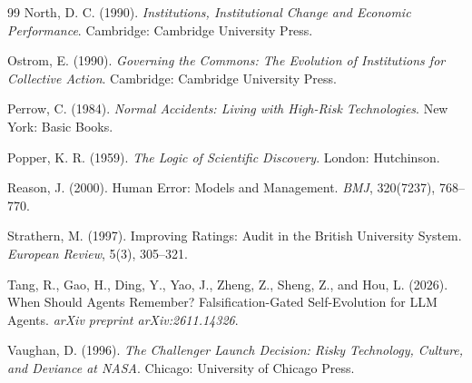 \documentclass[11pt]{article}
\theoremstyle{definition}
\begin{document}
\begin{thebibliography}{99}
North, D. C. (1990). \emph{Institutions, Institutional Change and Economic Performance}. Cambridge: Cambridge University Press.

Ostrom, E. (1990). \emph{Governing the Commons: The Evolution of Institutions for Collective Action}. Cambridge: Cambridge University Press.

Perrow, C. (1984). \emph{Normal Accidents: Living with High-Risk Technologies}. New York: Basic Books.

Popper, K. R. (1959). \emph{The Logic of Scientific Discovery}. London: Hutchinson.

Reason, J. (2000). Human Error: Models and Management. \emph{BMJ}, 320(7237), 768--770.

Strathern, M. (1997). Improving Ratings: Audit in the British University System. \emph{European Review}, 5(3), 305--321.

Tang, R., Gao, H., Ding, Y., Yao, J., Zheng, Z., Sheng, Z., and Hou, L. (2026). When Should Agents Remember? Falsification-Gated Self-Evolution for LLM Agents. \emph{arXiv preprint arXiv:2611.14326}.

Vaughan, D. (1996). \emph{The Challenger Launch Decision: Risky Technology, Culture, and Deviance at NASA}. Chicago: University of Chicago Press.

\end{thebibliography}
\end{document}
